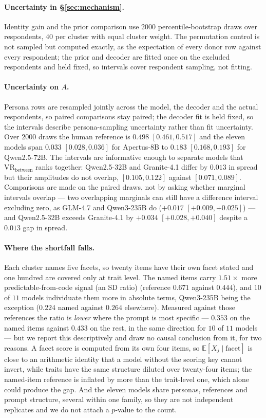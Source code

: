 \documentclass[11pt]{article}
\begin{document}
\paragraph{Uncertainty in \S\ref{sec:mechanism}.} Identity gain and the prior
comparison use $2000$ percentile-bootstrap draws over respondents, $40$ per
cluster with equal cluster weight. The permutation control is not sampled but
computed exactly, as the expectation of every donor row against every
respondent; the prior and decoder are fitted once on the excluded respondents and
held fixed, so intervals cover respondent sampling, not fitting.

\paragraph{Uncertainty on $A$.} Persona rows are resampled jointly across the
model, the decoder and the actual respondents, so paired comparisons stay
paired; the decoder fit is held fixed, so the intervals describe
persona-sampling uncertainty rather than fit uncertainty. Over $2000$ draws the
human reference is $0.498$ $[0.461,0.517]$ and the eleven models span $0.033$
$[0.028,0.036]$ for Apertus-8B to $0.183$ $[0.168,0.193]$ for Qwen2.5-72B. The
intervals are informative enough to separate models that
$\mathrm{VR}_\text{between}$ ranks together: Qwen2.5-32B and Granite-4.1 differ
by $0.013$ in spread but their amplitudes do not overlap, $[0.105,0.122]$
against $[0.071,0.089]$. Comparisons are made on the paired draws, not by asking whether marginal
intervals overlap --- two overlapping marginals can still have a difference
interval excluding zero, as GLM-4.7 and Qwen3-235B do ($+0.017$
$[+0.009,+0.025]$) --- and Qwen2.5-32B exceeds Granite-4.1 by $+0.034$
$[+0.028,+0.040]$ despite a $0.013$ gap in spread.

\paragraph{Where the shortfall falls.} Each cluster names five facets, so twenty
items have their own facet stated and one hundred are covered only at trait
level. The named items carry $1.51\times$ more predictable-from-code signal (an SD ratio)
(reference $0.671$ against $0.444$), and $10$ of $11$ models individuate them more
in absolute terms, Qwen3-235B being the exception ($0.224$ named against $0.264$
elsewhere). Measured against those references the ratio is \emph{lower}
where the prompt is most specific --- $0.353$ on the named items against $0.433$
on the rest, in the same direction for $10$ of $11$ models --- but we report this
descriptively and draw no causal conclusion from it, for two reasons. A facet
score is computed from its own four items, so $\mathbb{E}[X_j\mid\text{facet}]$
is close to an arithmetic identity that a model without the scoring key cannot
invert, while traits have the same structure diluted over twenty-four items; the
named-item reference is inflated by more than the trait-level one, which alone
could produce the gap. And the eleven models share personas, references and
prompt structure, several within one family, so they are not independent
replicates and we do not attach a $p$-value to the count.
\end{document}
